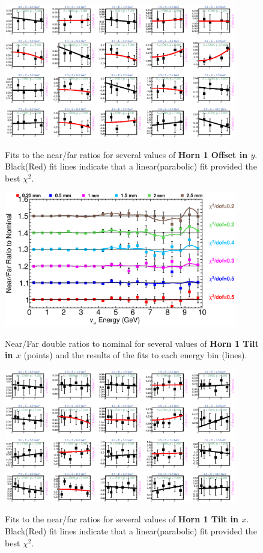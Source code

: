 \begin{figure}[hb]
  \begin{center}
    {\includegraphics[width=4.0in]{figures/Horn1YOffset_nof_fits.eps}}
  \end{center}
\caption{ Fits to the near/far ratios for several values of {\bf Horn 1 Offset in $y$}. Black(Red) fit lines indicate that a linear(parabolic) fit provided the best $\chi^2$. }
\end{figure}

\begin{figure}[ht]
  \begin{center}
    {\includegraphics[width=4.0in]{figures/Horn1XTilt_nof_summary.eps}}
  \end{center}
\caption{ Near/Far double ratios to nominal for several values of {\bf Horn 1 Tilt in $x$} (points) and the results of the fits to each energy bin (lines).}
\end{figure}

\begin{figure}[hb]
  \begin{center}
    {\includegraphics[width=4.0in]{figures/Horn1XTilt_nof_fits.eps}}
  \end{center}
\caption{ Fits to the near/far ratios for several values of {\bf Horn 1 Tilt in $x$}. Black(Red) fit lines indicate that a linear(parabolic) fit provided the best $\chi^2$. }
\end{figure}


